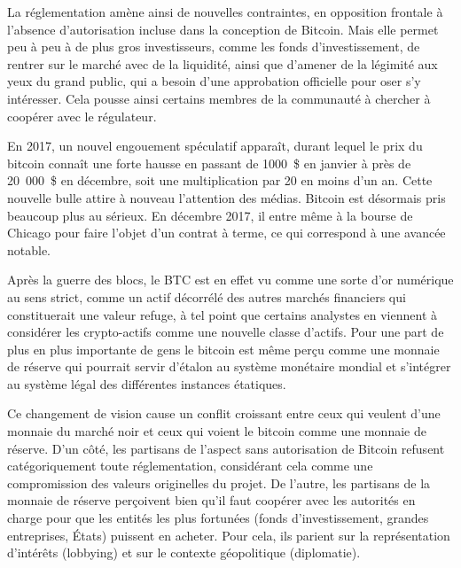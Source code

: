 La réglementation amène ainsi de nouvelles contraintes, en opposition frontale à l'absence d'autorisation incluse dans la conception de Bitcoin. Mais elle permet peu à peu à de plus gros investisseurs, comme les fonds d'investissement, de rentrer sur le marché avec de la liquidité, ainsi que d'amener de la légimité aux yeux du grand public, qui a besoin d'une approbation officielle pour oser s'y intéresser. Cela pousse ainsi certains membres de la communauté à chercher à coopérer avec le régulateur. %

En 2017, un nouvel engouement spéculatif apparaît, durant lequel le prix du bitcoin connaît une forte hausse en passant de 1000~\$ en janvier à près de 20~000~\$ en décembre, soit une multiplication par 20 en moins d'un an. Cette nouvelle bulle attire à nouveau l'attention des médias. Bitcoin est désormais pris beaucoup plus au sérieux. En décembre 2017, il entre même à la bourse de Chicago pour faire l'objet d'un contrat à terme, ce qui correspond à une avancée notable.

Après la guerre des blocs, le BTC est en effet vu comme une sorte d'or numérique au sens strict, comme un actif décorrélé des autres marchés financiers qui constituerait une valeur refuge, à tel point que certains analystes en viennent à considérer les crypto-actifs comme une nouvelle classe d'actifs. Pour une part de plus en plus importante de gens le bitcoin est même perçu comme une monnaie de réserve qui pourrait servir d'étalon au système monétaire mondial et s'intégrer au système légal des différentes instances étatiques.

Ce changement de vision cause un conflit croissant entre ceux qui veulent d'une monnaie du marché noir et ceux qui voient le bitcoin comme une monnaie de réserve. D'un côté, les partisans de l'aspect sans autorisation de Bitcoin refusent catégoriquement toute réglementation, considérant cela comme une compromission des valeurs originelles du projet. De l'autre, les partisans de la monnaie de réserve perçoivent bien qu'il faut coopérer avec les autorités en charge pour que les entités les plus fortunées (fonds d'investissement, grandes entreprises, États) puissent en acheter. Pour cela, ils parient sur la représentation d'intérêts (lobbying) et sur le contexte géopolitique (diplomatie).

